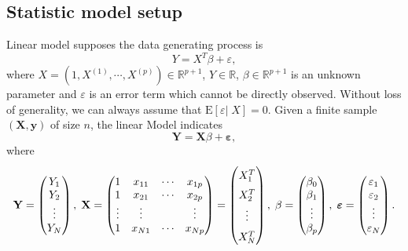 \documentclass{report}
\theoremstyle{nonumberplain}
\newcommand{\E}{\mathrm{E}}
\newcommand{\y}{\mathbf{y}}
\newcommand{\Y}{\mathbf{Y}}
\newcommand{\X}{\mathbf{X}}
\newcommand{\0}{\mathbf{0}}
\newcommand{\vep}{\bm{\varepsilon}}
\begin{document}
\subsection{Statistic model setup}
Linear model supposes the data generating process is
\[
Y= X^T\beta+\varepsilon,
\]
where $X=(1,X^{(1)},\cdots,X^{(p)})\in\mathbb{R}^{p+1}$, $Y\in\mathbb{R}$, $\beta\in\mathbb{R}^{p+1}$ is an unknown parameter and $\varepsilon$ is an error term which cannot be directly observed. Without loss of generality, we can always assume that $\E[\varepsilon|\;X]=0$.
Given a finite sample $(\X,\y)$ of size $n$, the linear Model indicates 
\[
\Y = {\mathbf{X}} \beta +\vep,
\]
where
\[
\Y=
\begin{pmatrix}
Y_1\\
Y_2\\
\vdots\\
Y_N
\end{pmatrix}
,\;{\mathbf{X}}=
\begin{pmatrix}
1& x_{11}&\cdots& x_{1p}\\
1& x_{21}&\cdots &x_{2p}\\
\vdots&\vdots& &\vdots\\
1& x_{N1}&\cdots &x_{Np}
\end{pmatrix}
\renewcommand*{\arraystretch}{1.5}
=\begin{pmatrix}
X_1^T\\
X_2^T\\
\vdots\\
X_N^T
\end{pmatrix}
\renewcommand*{\arraystretch}{1}
,\;
\beta=
\begin{pmatrix}
\beta_0\\
\beta_1\\
\vdots\\
\beta_p
\end{pmatrix}
,\;
\vep=
\begin{pmatrix}
\varepsilon_1\\
\varepsilon_2\\
\vdots\\
\varepsilon_N
\end{pmatrix}.
\]
\end{document}
